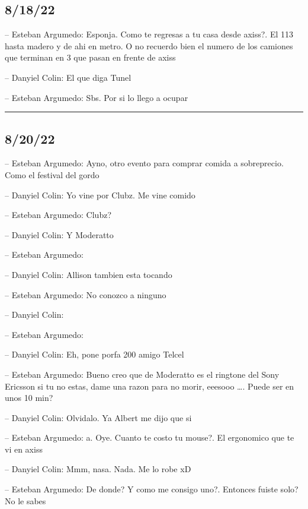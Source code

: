 \hypertarget{section-147}{%
\subsection{8/18/22}\label{section-147}}

-- Esteban Argumedo: Esponja. Como te regresas a tu casa desde axiss?.
El 113 hasta madero y de ahi en metro. O no recuerdo bien el numero de
los camiones que terminan en 3 que pasan en frente de axiss

-- Danyiel Colin: El que diga Tunel

-- Esteban Argumedo: Sbs. Por si lo llego a ocupar

\begin{center}\rule{0.5\linewidth}{0.5pt}\end{center}

\hypertarget{section-148}{%
\subsection{8/20/22}\label{section-148}}

-- Esteban Argumedo: Ayno, otro evento para comprar comida a
sobreprecio. Como el festival del gordo

-- Danyiel Colin: Yo vine por Clubz. Me vine comido

-- Esteban Argumedo: Clubz?

-- Danyiel Colin: Y Moderatto

-- Esteban Argumedo:

-- Danyiel Colin: Allison tambien esta tocando

-- Esteban Argumedo: No conozco a ninguno

-- Danyiel Colin:

-- Esteban Argumedo:

-- Danyiel Colin: Eh, pone porfa 200 amigo Telcel

-- Esteban Argumedo: Bueno creo que de Moderatto es el ringtone del Sony
Ericsson si tu no estas, dame una razon para no morir, eeesooo \ldots.
Puede ser en unos 10 min?

-- Danyiel Colin: Olvidalo. Ya Albert me dijo que si

-- Esteban Argumedo: a. Oye. Cuanto te costo tu mouse?. El ergonomico
que te vi en axiss

-- Danyiel Colin: Mmm, nasa. Nada. Me lo robe xD

-- Esteban Argumedo: De donde? Y como me consigo uno?. Entonces fuiste
solo? No le sabes


